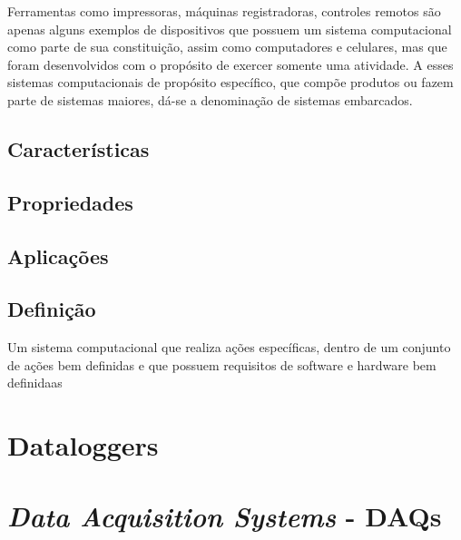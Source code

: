 Ferramentas como impressoras, máquinas registradoras, controles remotos são apenas alguns exemplos de dispositivos que possuem um sistema computacional como parte de sua constituição, assim como computadores e celulares, mas que foram desenvolvidos com o propósito de exercer somente uma atividade. A esses sistemas computacionais de propósito específico, que compõe produtos ou fazem parte de sistemas maiores, dá-se a denominação de sistemas embarcados.

\subsection{Características}


\subsection{Propriedades}



\subsection{Aplicações}






\subsection{Definição}

Um sistema computacional que realiza ações específicas, dentro de um conjunto de ações bem definidas e que possuem requisitos de software e hardware bem definidaas


\section{Dataloggers}\label{sec:datalogger}



\section{\textit{Data Acquisition Systems} - DAQs}


